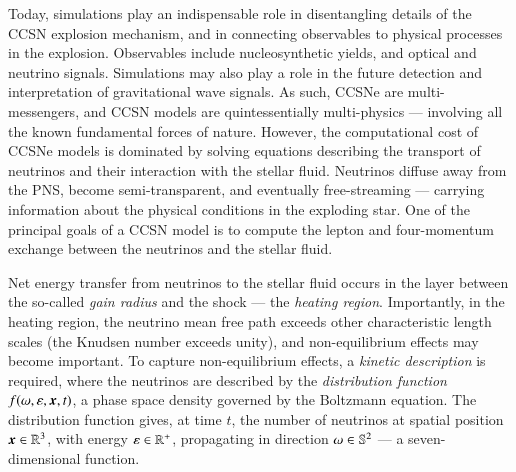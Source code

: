 \documentclass[11pt,letterpaper,twoside,english,final]{article}
\begin{document}
Today, simulations play an indispensable role in disentangling details of the CCSN explosion mechanism, and in connecting observables to physical processes in the explosion.  
Observables include nucleosynthetic yields, and optical and neutrino signals.  
Simulations may also play a role in the future detection and interpretation of gravitational wave signals.  
As such, CCSNe are multi-messengers, and CCSN models are quintessentially multi-physics --- involving all the known fundamental forces of nature.  
However, the computational cost of CCSNe models is dominated by solving equations describing the transport of neutrinos and their interaction with the stellar fluid. 
Neutrinos diffuse away from the PNS, become semi-transparent, and eventually free-streaming --- carrying information about the physical conditions in the exploding star.  
One of the principal goals of a CCSN model is to compute the lepton and four-momentum exchange between the neutrinos and the stellar fluid.  

Net energy transfer from neutrinos to the stellar fluid occurs in the layer between the so-called \emph{gain radius} and the shock --- the \emph{heating region}.  
Importantly, in the heating region, the neutrino mean free path exceeds other characteristic length scales (the Knudsen number exceeds unity), and non-equilibrium effects may become important.  
To capture non-equilibrium effects, a \emph{kinetic description} is required, where the neutrinos are described by the \emph{distribution function} $f(\omega,\varepsilon,\boldsymbol{x},t)$, a phase space density governed by the Boltzmann equation.  
The distribution function gives, at time $t$, the number of neutrinos at spatial position $\boldsymbol{x}\in\mathbb{R}^{3}$, with energy $\varepsilon\in\mathbb{R}^{+}$, propagating in direction $\omega\in\mathbb{S}^{2}$ --- a seven-dimensional function.  
\end{document}

